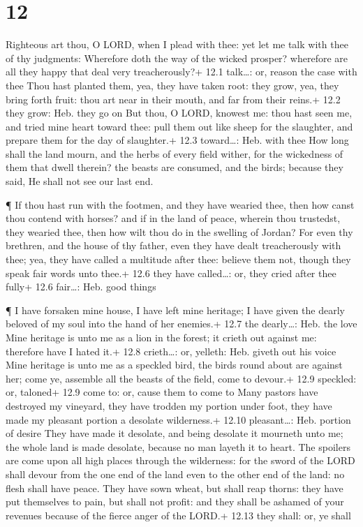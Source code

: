 \hypertarget{section-11}{%
\section{12}\label{section-11}}

 Righteous art thou, O LORD, when I plead with thee: yet let
me talk with thee of thy judgments: Wherefore doth the way of the wicked
prosper? wherefore are all they happy that deal very treacherously?+
12.1 talk\ldots: or, reason the case with thee  Thou hast
planted them, yea, they have taken root: they grow, yea, they bring
forth fruit: thou art near in their mouth, and far from their reins.+
12.2 they grow: Heb. they go on  But thou, O LORD, knowest
me: thou hast seen me, and tried mine heart toward thee: pull them out
like sheep for the slaughter, and prepare them for the day of
slaughter.+ 12.3 toward\ldots: Heb. with thee  How long
shall the land mourn, and the herbs of every field wither, for the
wickedness of them that dwell therein? the beasts are consumed, and the
birds; because they said, He shall not see our last end.

 ¶ If thou hast run with the footmen, and they have wearied
thee, then how canst thou contend with horses? and if in the land of
peace, wherein thou trustedst, they wearied thee, then how wilt thou do
in the swelling of Jordan?  For even thy brethren, and the
house of thy father, even they have dealt treacherously with thee; yea,
they have called a multitude after thee: believe them not, though they
speak fair words unto thee.+ 12.6 they have called\ldots: or, they cried
after thee fully+ 12.6 fair\ldots: Heb. good things

 ¶ I have forsaken mine house, I have left mine heritage; I
have given the dearly beloved of my soul into the hand of her enemies.+
12.7 the dearly\ldots: Heb. the love  Mine heritage is unto
me as a lion in the forest; it crieth out against me: therefore have I
hated it.+ 12.8 crieth\ldots: or, yelleth: Heb. giveth out his voice
 Mine heritage is unto me as a speckled bird, the birds
round about are against her; come ye, assemble all the beasts of the
field, come to devour.+ 12.9 speckled: or, taloned+ 12.9 come to: or,
cause them to come to  Many pastors have destroyed my
vineyard, they have trodden my portion under foot, they have made my
pleasant portion a desolate wilderness.+ 12.10 pleasant\ldots: Heb.
portion of desire  They have made it desolate, and being
desolate it mourneth unto me; the whole land is made desolate, because
no man layeth it to heart.  The spoilers are come upon all
high places through the wilderness: for the sword of the LORD shall
devour from the one end of the land even to the other end of the land:
no flesh shall have peace.  They have sown wheat, but shall
reap thorns: they have put themselves to pain, but shall not profit: and
they shall be ashamed of your revenues because of the fierce anger of
the LORD.+ 12.13 they shall: or, ye shall

